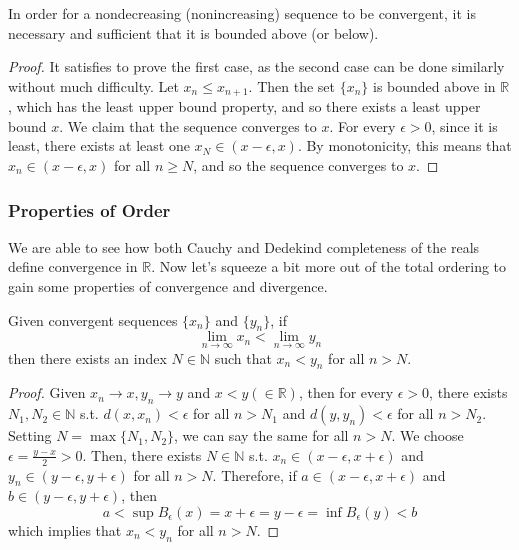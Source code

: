     \begin{lemma}
      In order for a nondecreasing (nonincreasing) sequence to be convergent, it is necessary and sufficient that it is bounded above (or below). 
    \end{lemma}
    \begin{proof}
      It satisfies to prove the first case, as the second case can be done similarly without much difficulty. Let $x_n \leq x_{n+1}$. Then the set $\{x_n\}$ is bounded above in $\mathbb{R}$, which has the least upper bound property, and so there exists a least upper bound $x$. We claim that the sequence converges to $x$. For every $\epsilon > 0$, since it is least, there exists at least one $x_N \in (x - \epsilon, x)$. By monotonicity, this means that $x_n \in (x - \epsilon, x)$ for all $n \geq N$, and so the sequence converges to $x$. 
    \end{proof}

  \subsubsection{Properties of Order}

    We are able to see how both Cauchy and Dedekind completeness of the reals define convergence in $\mathbb{R}$. Now let's squeeze a bit more out of the total ordering to gain some properties of convergence and divergence.   

    \begin{theorem}
      Given convergent sequences $\{x_n\}$ and $\{y_n\}$, if 
      \begin{equation}
        \lim_{n \rightarrow \infty} x_n < \lim_{n \rightarrow \infty} y_n
      \end{equation}
      then there exists an index $N \in \mathbb{N}$ such that $x_n < y_n$ for all $n > N$. 
    \end{theorem}
    \begin{proof}
      Given $x_n \rightarrow x, y_n \rightarrow y$ and $x < y (\in \mathbb{R})$, then for every $\epsilon > 0$, there exists $N_1, N_2 \in \mathbb{N}$ s.t. $d(x, x_n) < \epsilon$ for all $n > N_1$ and $d(y, y_n) < \epsilon$ for all $n > N_2$. Setting $N = \max\{N_1, N_2\}$, we can say the same for all $n > N$. We choose $\epsilon = \frac{y - x}{2} > 0$. Then, there exists $N \in \mathbb{N}$ s.t. $x_n \in (x - \epsilon, x + \epsilon)$ and $y_n \in (y - \epsilon, y + \epsilon)$ for all $n > N$. Therefore, if $a \in (x - \epsilon, x + \epsilon)$ and $b \in (y - \epsilon, y + \epsilon)$, then 
      \[a < \sup B_\epsilon (x) = x + \epsilon = y - \epsilon = \inf B_\epsilon (y) < b\]
      which implies that $x_n < y_n$ for all $n > N$. 
    \end{proof}

